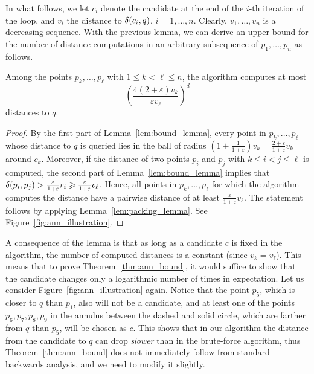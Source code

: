 \documentclass{ws-ijcga}
\renewcommand{\leq}{\leqslant}
\renewcommand{\geq}{\geqslant}
\newcommand{\eps}{\varepsilon}
\begin{document}
In what follows, we let $c_i$ denote the candidate
at the end of the $i$-th iteration of the loop, and $v_i$
the distance to $\delta(c_i, q)$, $i = 1, \dots, n$. Clearly, $v_1,\ldots,v_n$ is a decreasing sequence.
With the previous lemma, we can derive an upper bound for the number
of distance computations in an arbitrary subsequence of $p_1,\ldots,p_n$
as follows. 

\begin{lemma}
\label{lem:sequence_lemma}
Among the points $p_k,\ldots,p_\ell$ with $1\leq k< \ell\leq n$, the algorithm computes at most
\[\left(\frac{4(2+\eps) v_k}{\eps v_\ell}\right)^{d}\]
distances to $q$.
\end{lemma}
\begin{proof}
By the first part of Lemma~\ref{lem:bound_lemma}, every point in $p_k,\ldots,p_\ell$
whose distance to $q$ is queried lies in the ball of radius $(1+\frac{1}{1+\eps})v_k=\frac{2+\eps}{1+\eps} v_k$
around $c_k$. Moreover, if the distance of two points $p_i$ and $p_j$ with $k\leq i<j\leq\ell$
is computed, the second part of Lemma~\ref{lem:bound_lemma} implies that $\dist(p_i,p_j)> \frac{\eps}{1+\eps}r_i\geq \frac{\eps}{1+\eps}v_\ell$.
Hence, all points in $p_k,\ldots,p_\ell$ for which the algorithm computes the distance
have a pairwise distance of at least $\frac{\eps}{1+\eps}v_\ell$. The statement follows by applying Lemma~\ref{lem:packing_lemma}.
See Figure~\ref{fig:ann_illustration}.
\end{proof}

A consequence of the lemma is that as long as a candidate $c$ is fixed in the algorithm,
the number of computed distances is a constant (since $v_k=v_\ell$). 
This means that to prove Theorem~\ref{thm:ann_bound}, it would suffice to show
that the candidate changes only a logarithmic number of times in expectation.
Let us consider Figure~\ref{fig:ann_illustration} again. Notice that the point $p_5$, which
is closer to $q$ than $p_1$, also will not be a candidate, and at least one of the points 
$p_6,p_7,p_8,p_9$ in the annulus between the dashed and solid circle, which are farther from 
$q$ than $p_5$, will be chosen as $c$. This shows that in our algorithm the distance from the 
candidate to $q$ can drop \textit{slower} than in the brute-force algorithm, 
thus Theorem~\ref{thm:ann_bound} does not immediately follow from standard backwards analysis,
and we need to modify it slightly.
\end{document}

